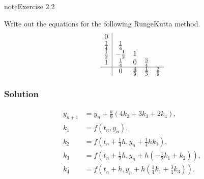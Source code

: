 \documentclass[letterpaper,10pt,english]{jupyterBook}
\begin{document}
\begin{sphinxadmonition}{note}{Exercise 2.2}

\sphinxAtStartPar
Write out the equations for the following Runge\sphinxhyphen{}Kutta method.
\begin{align*}\begin{array}{c|cccc}
    0 &  &  &  & \\
    \frac{1}{4} & \frac{1}{4} &  &  & \\
    \frac{1}{2} & -\frac{1}{2} & 1 &  & \\
    1 & \frac{1}{4} & 0 & \frac{3}{4} & \\ \hline
    & 0 & \frac{4}{9} & \frac{1}{3} & \frac{2}{9}
\end{array}\end{align*}\subsubsection*{Solution}
\begin{align*}
    y_{n+1} &= y_n + \frac{h}{9}(4k_2 + 3k_3 + 2k_4), \\
    k_1 &= f(t_n, y_n), \\
    k_2 &= f(t_n + \tfrac{1}{4}h, y_n + \tfrac{1}{4} h k_1), \\
    k_3 &= f(t_n + \tfrac{1}{2}h, y_n + h ( - \tfrac{1}{2}k_1 + k_2)), \\
    k_4 &= f(t_n + h, y_n + h ( \tfrac{1}{4}k_1 + \tfrac{3}{4}k_3)).
\end{align*}\end{sphinxadmonition}
\end{document}
